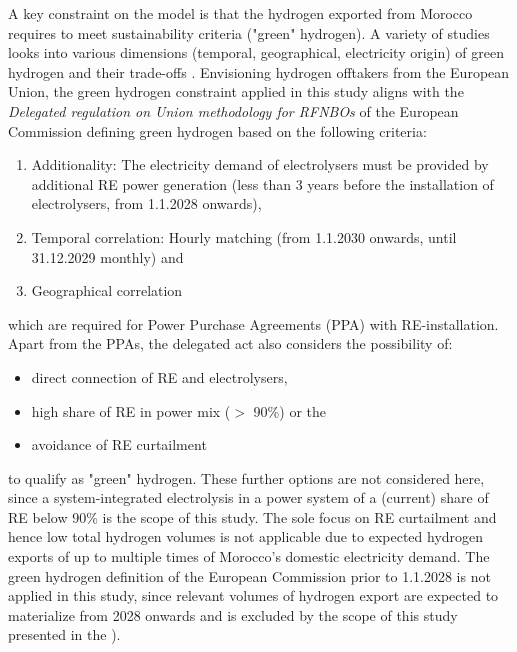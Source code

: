 A key constraint on the model is that the hydrogen exported from Morocco requires to meet sustainability criteria ("green" hydrogen). A variety of studies looks into various dimensions (temporal, geographical, electricity origin) of green hydrogen and their trade-offs \cite{Brauer2022, Ruhnau2022}. %
Envisioning hydrogen offtakers from the European Union, the green hydrogen constraint applied in this study aligns with the \emph{Delegated regulation on Union methodology for RFNBOs} of the European Commission \cite{Commission2023} defining green hydrogen  based on the following criteria:

\begin{enumerate}
    \item Additionality: The electricity demand of electrolysers must be provided by additional RE power generation (less than 3 years before the installation of electrolysers, from 1.1.2028 onwards),
    \item Temporal correlation: Hourly matching (from 1.1.2030 onwards, until 31.12.2029 monthly) and
    \item Geographical correlation
\end{enumerate}
which are required for Power Purchase Agreements (PPA) with RE-installation. Apart from the PPAs, the delegated act also considers the possibility of:
\begin{itemize}
    \item direct connection of RE and electrolysers,
    \item high share of RE in power mix ($>$ 90\%) or the
    \item avoidance of RE curtailment
\end{itemize}
to qualify as "green" hydrogen. These further options are not considered here, since a system-integrated electrolysis in a power system of a (current) share of RE below 90\% is the scope of this study. The sole focus on RE curtailment and hence low total hydrogen volumes is not applicable due to expected hydrogen exports of up to multiple times of Morocco's domestic electricity demand. The green hydrogen definition of the European Commission prior to 1.1.2028 is not applied in this study, since relevant volumes of hydrogen export are expected to materialize from 2028 onwards and is excluded by the scope of this study presented in the ).


